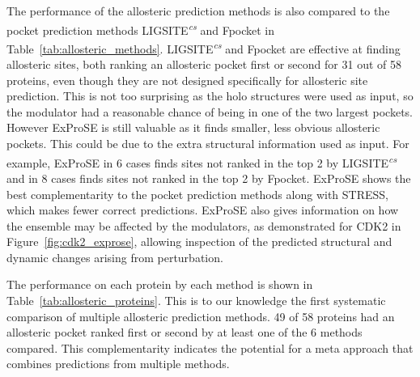 The performance of the allosteric prediction methods is also compared to the pocket prediction methods LIGSITE\textsuperscript{\it cs} and Fpocket \cite{LeGuilloux2009} in Table~\ref{tab:allosteric_methods}.
LIGSITE\textsuperscript{\it cs} and Fpocket are effective at finding allosteric sites, both ranking an allosteric pocket first or second for 31 out of 58 proteins, even though they are not designed specifically for allosteric site prediction.
This is not too surprising as the holo structures were used as input, so the modulator had a reasonable chance of being in one of the two largest pockets.
However ExProSE is still valuable as it finds smaller, less obvious allosteric pockets.
This could be due to the extra structural information used as input.
For example, ExProSE in 6 cases finds sites not ranked in the top 2 by LIGSITE\textsuperscript{\it cs} and in 8 cases finds sites not ranked in the top 2 by Fpocket.
ExProSE shows the best complementarity to the pocket prediction methods along with STRESS, which makes fewer correct predictions.
ExProSE also gives information on how the ensemble may be affected by the modulators, as demonstrated for CDK2 in Figure~\ref{fig:cdk2_exprose}, allowing inspection of the predicted structural and dynamic changes arising from perturbation.

The performance on each protein by each method is shown in Table~\ref{tab:allosteric_proteins}.
This is to our knowledge the first systematic comparison of multiple allosteric prediction methods.
49 of 58 proteins had an allosteric pocket ranked first or second by at least one of the 6 methods compared.
This complementarity indicates the potential for a meta approach that combines predictions from multiple methods.


